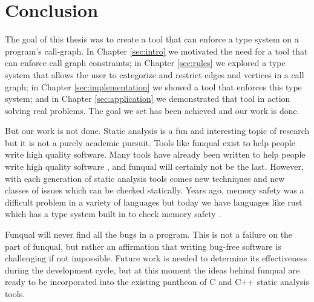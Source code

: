 \chapter{Conclusion}\label{sec:conclusion}

The goal of this thesis was to create a tool that can enforce a type system on a program's call-graph.  In Chapter \ref{sec:intro} we motivated the need for a tool that can enforce call graph constraints; in Chapter \ref{sec:rules} we explored a type system that allows the user to categorize and restrict edges and vertices in a call graph; in Chapter \ref{sec:implementation} we showed a tool that enforces this type system; and in Chapter \ref{sec:application} we demonstrated that tool in action solving real problems.  The goal we set has been achieved and our work is done. 

But our work is not done.  Static analysis is a fun and interesting topic of research but it is not a purely academic pursuit.  Tools like funqual exist to help people write high quality software.  Many tools have already been written to help people write high quality software \cite{jqual-inference, staticanal, lclint-og, lclint-memory}, and funqual will certainly not be the last.  However, with each generation of static analysis tools comes new techniques and new classes of issues which can be checked statically.  Years ago, memory safety was a difficult problem in a variety of languages but today we have languages like rust which has a type system built in to check memory safety \cite{rust-is-dope}.  

Funqual will never find all the bugs in a program.  This is not a failure on the part of funqual, but rather an affirmation that writing bug-free software is challenging if not impossible.  Future work is needed to determine its effectiveness during the development cycle, but at this moment the ideas behind funqual are ready to be incorporated into the existing pantheon of C and C++ static analysis tools.  

